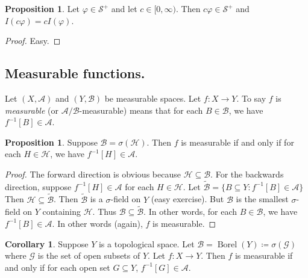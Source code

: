\documentclass{article}
\DeclareMathOperator{\Borel}{Borel}
\newcommand{\longtilde}[1]{\widetilde{#1}}
\theoremstyle{definition}
\newtheorem{corollary}[theorem]{Corollary}
\newtheorem{proposition}[theorem]{Proposition}
\begin{document}
\begin{proposition}
    Let $\varphi \in \mathscr{S}^+$ and let $c \in [0,\infty)$. Then $c\varphi \in \mathscr{S}^+$ and $I(c\varphi) = cI(\varphi)$.
\end{proposition}
\begin{proof}
    Easy.
\end{proof}

\subsection*{Measurable functions.}

Let $(X, \mathscr{A})$ and $(Y, \mathscr{B})$ be measurable spaces. Let $f:X \longrightarrow Y$. To say $f$ is \emph{measurable} (or $\mathscr{A}/\mathscr{B}$-measurable) means that for each $B \in \mathscr{B}$, we have $f^{-1}[B] \in \mathscr{A}$.

\begin{proposition}
    Suppose $\mathscr{B} = \sigma(\mathscr{H})$. Then $f$ is measurable if and only if for each $H \in \mathscr{H}$, we have $f^{-1}[H] \in \mathscr{A}$.
\end{proposition}
\begin{proof}
    The forward direction is obvious because $\mathscr{H}\subseteq\mathscr{B}$. For the backwards direction, suppose $f^{-1}[H]\in\mathscr{A}$ for each $H\in\mathscr{H}$. Let $\widetilde{\mathscr{B}} = \{ B\subseteq Y : f^{-1}[B]\in\mathscr{A} \}$ Then $\mathscr{H}\subseteq\widetilde{\mathscr{B}}$. Then $\longtilde{\mathscr{B}}$ is a $\sigma$-field on $Y$ (easy exercise). But $\mathscr{B}$ is the smallest $\sigma$-field on $Y$ containing $\mathscr{H}$. Thus $\mathscr{B}\subseteq\longtilde{\mathscr{B}}$. In other words, for each $B\in\mathscr{B}$, we have $f^{-1}[B]\in\mathscr{A}$. In other words (again), $f$ is measurable.
\end{proof}

\begin{corollary}
    Suppose $Y$ is a topological space. Let $\mathscr{B} = \Borel(Y) \coloneqq \sigma(\mathscr{G})$ where $\mathscr{G}$ is the set of open subsets of $Y$.
    Let $f:X \longrightarrow Y$. Then $f$ is measurable if and only if for each open set $G \subseteq Y$, $f^{-1}[G] \in \mathscr{A}$.
\end{corollary}
\end{document}
